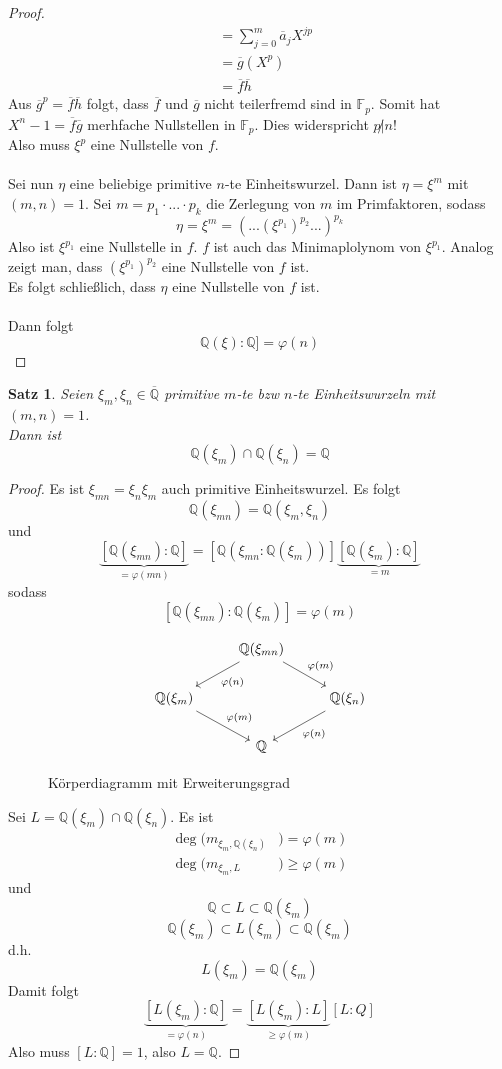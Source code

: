 \documentclass[10pt,a4paper]{article}
\newcommand{\Q}{\ensuremath{\mathbb{Q}}}
\newcommand{\F}{\ensuremath{\mathbb{F}}}
\newcommand{\ol}[1]{\overline{#1}}
\theoremstyle{plain}
\newtheorem{satz}[theorem]{Satz}
\theoremstyle{definition}
\theoremstyle{remark}
\begin{document}
\begin{proof}
\begin{align*}
		&=\sum_{j=0}^{m}\ol a_jX^{jp}\\
		&=\ol g(X^p)\\
		&=\ol f\ol h
		\end{align*}
		Aus $\ol g^p=\ol f \ol h$ folgt, dass $\ol f$ und $\ol g$ nicht teilerfremd sind in $\F_p$. Somit hat $X^n-1=\ol f\ol g$ merhfache Nullstellen in $\F_p$. Dies widerspricht $p\not|n$!\\
		Also muss $\xi^p$ eine Nullstelle von $f$.\\
		\\
		Sei nun $\eta$ eine beliebige primitive $n$-te Einheitswurzel. Dann ist $\eta=\xi^m$ mit $(m,n)=1$. Sei $m=p_1\cdot...\cdot p_k$ die Zerlegung von $m$ im Primfaktoren, sodass
		\[\eta=\xi^m=(...(\xi^{p_1})^{p_2}...)^{p_k}\]
		Also ist $\xi^{p_1}$ eine Nullstelle in $f$. $f$ ist auch das Minimaplolynom von $\xi^{p_1}$. Analog zeigt man, dass $(\xi^{p_1})^{p_2}$ eine Nullstelle von $f$ ist.\\
		Es folgt schließlich, dass $\eta$ eine Nullstelle von $f$ ist.\\ 
		\\
		Dann folgt
		\[\Q(\xi):\Q]=\varphi(n)\]
	\end{proof}
	
	
	\begin{satz}
		Seien $\xi_m,\xi_n\in\ol{\Q}$ primitive $m$-te bzw $n$-te Einheitswurzeln mit $(m,n)=1$.\\
		Dann ist
		\[\Q(\xi_m)\cap \Q(\xi_n)=\Q\]
	\end{satz}
	\begin{proof}
		Es ist $\xi_{mn}=\xi_n\xi_m$ auch primitive Einheitswurzel. Es folgt
		\[\Q(\xi_{mn})=\Q(\xi_m,\xi_n)\]
		und
		\[\underbrace{[\Q(\xi_{mn}):\Q]}_{=\varphi(mn)}=[\Q(\xi_{mn}:\Q(\xi_m))]\underbrace{[\Q(\xi_m):\Q]}_{=m}\]
		sodass
		\[[\Q(\xi_{mn}):\Q(\xi_m)]=\varphi(m)\]
		\begin{figure}[h]
			\centering
			\[\begin{tikzcd}
				&\Q(\xi_{mn})\ar[dl,"\varphi(n)"]\ar[dr,"\varphi(m)"]&\\
				\Q(\xi_m)\ar[dr,"\varphi(m)"]&&\Q(\xi_n)\ar["\varphi(n)",dl]\\
				&\Q&
			\end{tikzcd}\]
			\caption{Körperdiagramm mit Erweiterungsgrad}
			\label{fig:cdUnitRoot}
		\end{figure}
	
		Sei $L=\Q(\xi_m)\cap\Q(\xi_n)$. Es ist
		\begin{align*}
		\deg(m_{\xi_m,\Q(\xi_n)}&)=\varphi(m)\\
		\deg(m_{\xi_m,L}&)\geq\varphi(m)
		\end{align*}
		und
		\[\Q\subset L\subset \Q(\xi_m)\]
		\[\Q(\xi_m)\subset L(\xi_m)\subset \Q(\xi_m)\]
		d.h.
		\[L(\xi_m)=\Q(\xi_m)\]
		Damit folgt
		\[\underbrace{[L(\xi_m):\Q]}_{=\varphi(n)}=\underbrace{[L(\xi_m):L]}_{\geq \varphi(m)}[L:Q]\]
		Also muss $[L:\Q]=1$, also $L=\Q$.
	\end{proof}
\end{document}
